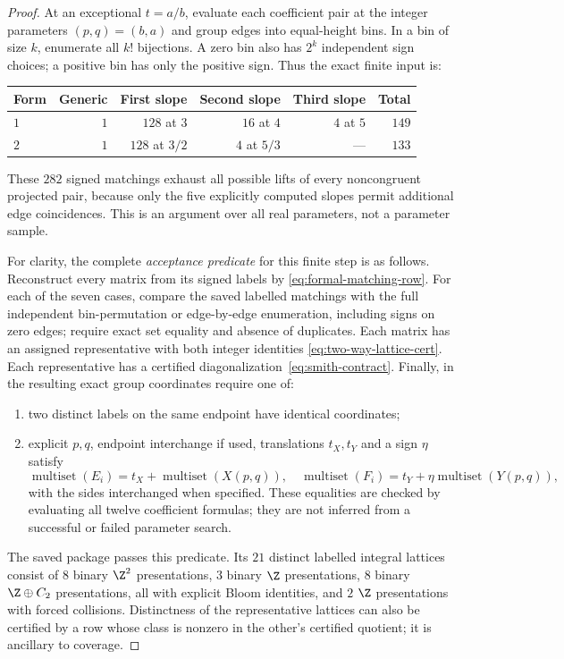 \begin{proof}
At an exceptional $t=a/b$, evaluate each coefficient pair at the integer
parameters $(p,q)=(b,a)$ and group edges into equal-height bins. In a bin
of size $k$, enumerate all $k!$ bijections. A zero bin also has $2^k$
independent sign choices; a positive bin has only the positive sign.
Thus the exact finite input is:
\begin{center}\small
\begin{tabular}{lrrrrr}
\toprule
Form & Generic & First slope & Second slope & Third slope & Total\\
\midrule
$1$ & $1$ & $128$ at $3$ & $16$ at $4$ & $4$ at $5$ & $149$\\
$2$ & $1$ & $128$ at $3/2$ & $4$ at $5/3$ & --- & $133$\\
\bottomrule
\end{tabular}
\end{center}
These $282$ signed matchings exhaust all possible lifts of every
noncongruent projected pair, because only the five explicitly computed
slopes permit additional edge coincidences. This is an argument over all
real parameters, not a parameter sample.

For clarity, the complete \emph{acceptance predicate} for this finite
step is as follows. Reconstruct every matrix from its signed labels by
\eqref{eq:formal-matching-row}. For each of the seven cases, compare the
saved labelled matchings with the full independent bin-permutation or
edge-by-edge enumeration, including signs on zero edges; require exact
set equality and absence of duplicates. Each matrix has an assigned
representative with both integer identities
\eqref{eq:two-way-lattice-cert}. Each representative has a certified
diagonalization~\eqref{eq:smith-contract}. Finally, in the resulting
exact group coordinates require one of:
\begin{enumerate}
 \item two distinct labels on the same endpoint have identical coordinates;
 \item explicit $p,q$, endpoint interchange if used, translations $t_X,t_Y$
 and a sign $\eta$ satisfy
 \[
 \operatorname{multiset}(E_i)=t_X+\operatorname{multiset}(X(p,q)),\quad
 \operatorname{multiset}(F_i)=t_Y+\eta\operatorname{multiset}(Y(p,q)),
 \]
 with the sides interchanged when specified. These equalities are checked
 by evaluating all twelve coefficient formulas; they are not inferred
 from a successful or failed parameter search.
\end{enumerate}
The saved package passes this predicate. Its $21$ distinct labelled
integral lattices consist of $8$ binary $\Z^2$ presentations, $3$ binary
$\Z$ presentations, $8$ binary $\Z\oplus C_2$ presentations, all with
explicit Bloom identities, and $2$ $\Z$ presentations with forced
collisions. Distinctness of the representative lattices can also be
certified by a row whose class is nonzero in the other's certified quotient;
it is ancillary to coverage.


\end{proof}
